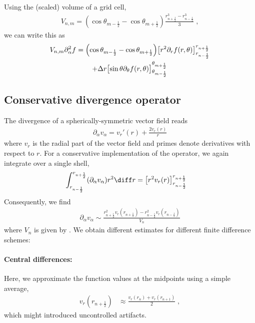 \documentclass[
	superscriptaddress,
	twocolumn,
	aps, pre
]{revtex4-1}
\begin{document}
Using the (scaled) volume of a grid cell,
\begin{align}
	V_{n,m} =
		\left(\cos\theta_{m-\frac12} - \cos\theta_{m + \frac12}\right)
		\frac{r_{n + \frac12}^3 - r_{n - \frac12}^3}{3}
	\;,
\end{align}
we can write this as
\begin{multline}
	V_{n,m} \partial_\alpha^2 f
=\Bigl(\cos\theta_{m-\frac12} - \cos\theta_{m + \frac12}\Bigr)
			\bigl[r^2 \partial_r f(r, \theta)\bigr]_{r_{n - \frac12}}^{r_{n + \frac12}}
\\
	+  \Delta r
		\bigl[ \sin\theta \partial_\theta  f(r, \theta)\bigr]_{\theta_{m - \frac12}}^{\theta_{m + \frac12}}
\end{multline}


\subsection{Conservative divergence operator}
The divergence of a spherically-symmetric vector field reads
\begin{align}
	\partial_\alpha v_\alpha = v_r'(r)+\frac{2 v_r(r)}{r}
\end{align}
where $v_r$ is the radial part of the vector field and primes denote derivatives with respect to $r$.
For a conservative implementation of the operator, we again integrate over a single shell,
\begin{align}
	\int_{r_{n-\frac12}}^{r_{n + \frac12}} (\partial_\alpha v_{\alpha}) r^2 \diff r 
	 &= \left[r^2 v_r(r)\right]_{r_{n-\frac12}}^{r_{n + \frac12}}
\end{align}
Consequently, we find
\begin{align}
	\partial_\alpha v_{\alpha} \sim
	 \frac{r_{n + \frac12}^2 v_r(r_{n + \frac12}) - r_{n - \frac12}^2 v_r(r_{n - \frac12})}{V_n}
\end{align}
where $V_n$ is given by .
We obtain different estimates for different finite difference schemes:

\paragraph{Central differences:}
Here, we approximate the function values at the midpoints using a simple average,
\begin{align}
	v_r(r_{n + \frac12}) &\approx \frac{v_r(r_{n}) + v_r(r_{n+1})}{2}
	\;,
\end{align}
which might introduced uncontrolled artifacts.
\end{document}
